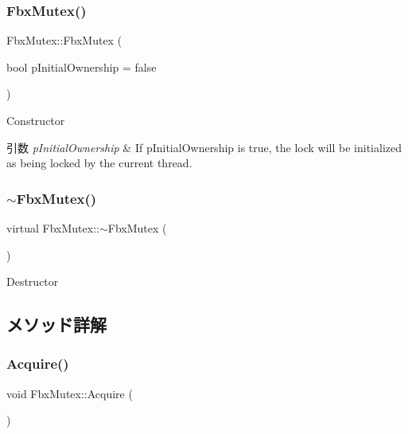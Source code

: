 \subsubsection{\texorpdfstring{Fbx\+Mutex()}{FbxMutex()}}
{\footnotesize\ttfamily Fbx\+Mutex\+::\+Fbx\+Mutex (\begin{DoxyParamCaption}\item[{bool}]{p\+Initial\+Ownership = {\ttfamily false} }\end{DoxyParamCaption})}

Constructor 
\begin{DoxyParams}{引数}
{\em p\+Initial\+Ownership} & If p\+Initial\+Ownership is true, the lock will be initialized as being locked by the current thread. \\
\hline
\end{DoxyParams}
\mbox{\label{class_fbx_mutex_a68eda93d02e2adc9f717d28208305aa6}} 
\subsubsection{\texorpdfstring{$\sim$\+Fbx\+Mutex()}{~FbxMutex()}}
{\footnotesize\ttfamily virtual Fbx\+Mutex\+::$\sim$\+Fbx\+Mutex (\begin{DoxyParamCaption}{ }\end{DoxyParamCaption})\hspace{0.3cm}{\ttfamily [virtual]}}



Destructor 



\subsection{メソッド詳解}
\mbox{\label{class_fbx_mutex_abca054ea52a16ade66050af56a04b97c}} 
\subsubsection{\texorpdfstring{Acquire()}{Acquire()}}
{\footnotesize\ttfamily void Fbx\+Mutex\+::\+Acquire (\begin{DoxyParamCaption}{ }\end{DoxyParamCaption})}

